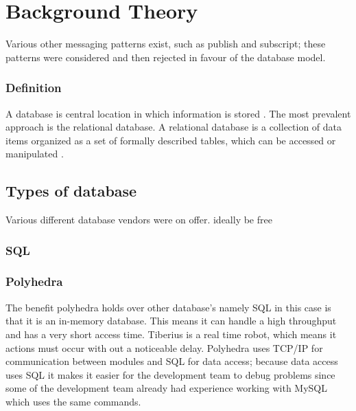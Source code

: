 \section{Background Theory}
Various other messaging patterns exist, such as publish and subscript; these patterns were considered and then rejected in favour of the database model.

\subsubsection{Definition}
A database is central location in which information is stored \cite{databasedefinition}. The most prevalent approach is the relational database. A relational database is a collection of data items organized as a set of formally described tables, which can be accessed or manipulated \cite{relationaldatabasedefinition}.

\subsection{Types of database}
Various different database vendors were on offer. 
ideally be free 

\subsubsection{SQL}


\subsubsection{Polyhedra}
The benefit polyhedra holds over other database's namely SQL in this case is that it is an in-memory database. This means it can handle a high throughput and has a very short access time. Tiberius is a real time robot, which means it actions must occur with out a noticeable delay. 
\newline
Polyhedra uses TCP/IP for communication between modules and SQL for data access; because data access uses SQL it makes it easier for the development team to debug problems since some of the development team already had experience working with MySQL which uses the same commands. 

